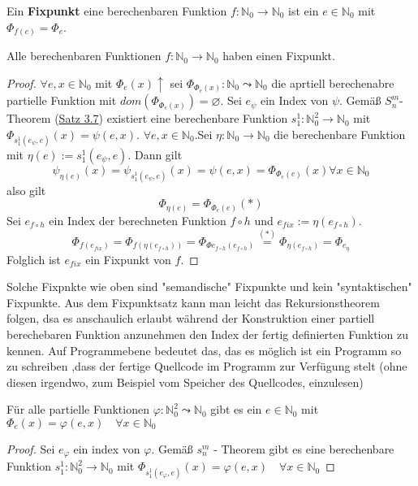     Ein \textbf{Fixpunkt} eine berechenbaren Funktion \(f: \mathbb{N}_0 \to \mathbb{N}_0\) ist ein \(e \in \mathbb{N}_0\) mit \(\Phi_{f(e)} = \Phi_e\).

    Alle berechenbaren Funktionen \(f : \mathbb{N}_0 \to \mathbb{N}_0\) haben einen Fixpunkt.
    \begin{proof}
      \(\forall e, x \in \mathbb{N}_0\) mit \(\Phi_e(x) \uparrow\) sei \(\Phi_{\Phi_e(x)} : \mathbb{N}_0 \leadsto \mathbb{N}_0\) die aprtiell berechenabre partielle Funktion mit \(dom(\Phi_{\Phi_e(x)}) = \varnothing\). Sei \(e_{\psi}\) ein Index von \(\psi\). Gemäß \(S_n^m\)-Theorem (\hyperref[subsec:3.16]{Satz 3.7}) existiert eine berechenbare Funktion \(s_1^1 : \mathbb{N}_0^2 \to \mathbb{N}_0\) mit \(\Phi_{s_1^1(e_{\psi}, e)}(x) = \psi(e, x)\). \(\forall e, x \in \mathbb{N}_0\).Sei \(\eta : \mathbb{N}_0 \to \mathbb{N}_0\) die berechenbare Funktion mit \(\eta (e) := s_1^1(e_{\psi}, e)\). Dann gilt 
      \[
        \psi_{\eta(e)}(x) = \psi_{s_1^1(e_{\psi}, e)}(x) = \psi(e, x) = \Phi_{\Phi_e(e)}(x) \forall x \in \mathbb{N}_0
      \]
      also gilt 
      \[
        \Phi_{\eta(e)} = \Phi_{\Phi_e (e)} (*)
      \]
      Sei \(e_{f \circ h}\) ein Index der berechneten Funktion \(f \circ h\) und \(e_{fix} := \eta(e_{f\circ h})\). 
      \[
        \Phi_{f(e_{fix})} = \Phi_{f(\eta(e_{f \circ h}))} = \Phi_{\Phi{e_{f\circ h}} (e_{f\circ h})} \overset{(*)}{=} \Phi_{\eta(e_{f \circ h})} = \Phi_{e_\eta}
      \] Folglich ist \(e_{fix}\) ein Fixpunkt von \(f\). 
    \end{proof}
    Solche Fixpnkte wie oben sind "semandische" Fixpunkte und kein "syntaktischen" Fixpunkte. Aus dem Fixpunktsatz kann man leicht das Rekursionstheorem folgen, dsa es anschaulich erlaubt während der Konstruktion einer partiell berechebaren Funktion anzunehmen den Index der fertig definierten Funktion zu kennen. Auf Programmebene bedeutet das, das es möglich ist ein Programm so zu schreiben ,dass der fertige Quellcode im Programm zur Verfügung stelt (ohne diesen irgendwo, zum Beispiel vom Speicher des Quellcodes, einzulesen)

    Für alle partielle Funktionen \(\varphi : \mathbb{N}_0^2 \leadsto \mathbb{N}_0\) gibt es ein \(e \in \mathbb{N}_0\) mit \(\Phi_e(x) = \varphi(e, x) \quad \forall x \in \mathbb{N}_0\) 

    \begin{proof}
      Sei \(e_{\varphi}\) ein index von \(\varphi\). Gemäß \(s_n^m\) - Theorem gibt es eine berechenbare Funktion \(s_1^1 : \mathbb{N}_0^2 \to \mathbb{N}_0\) mit \(\Phi_{s^1_1 (e_{\varphi}, e)} (x) = \varphi (e, x) \quad \forall x \in \mathbb{N}_0\)
    \end{proof}

